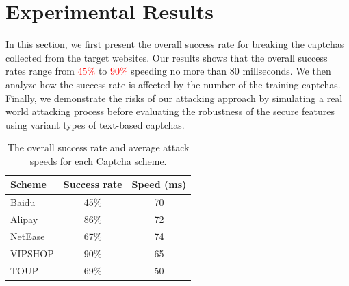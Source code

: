 \section{Experimental Results}
In this section, we first present the overall success rate for breaking the captchas collected from the target websites. Our results shows that the overall success rates range from \textcolor{red}{45\%} to \textcolor{red}{90\%} speeding no more than 80 millseconds.
We then analyze how the success rate is affected by the number of the training captchas.
Finally, we demonstrate the risks of our attacking approach by simulating a real world attacking process before evaluating the robustness of the secure features using variant types of text-based captchas.

\begin{table}[t]
    \centering
    \caption{The overall success rate and average attack speeds for each Captcha scheme.}
    \label{table: overall_rate}
    \begin{tabular}{lcc}
        \toprule
        Scheme & Success rate  & Speed (ms)\\
        \midrule
        Baidu & 45\% & 70 \\
        Alipay & 86\% & 72 \\
        NetEase & 67\% & 74 \\
        VIPSHOP & 90\% & 65 \\
        TOUP & 69\% & 50 \\
        \bottomrule
    \end{tabular}
\end{table}

